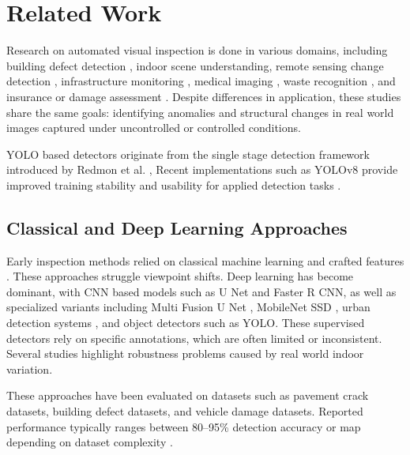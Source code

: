 \section{Related Work}
\label{sec:related_work}

Research on automated visual inspection is done in various domains, including building defect detection \cite{wen_autonomous_2024, kang_improvement_2025}, indoor scene understanding, remote sensing change detection \cite{cheng_change_2024}, infrastructure monitoring \cite{shang_automatic_2023}, medical imaging \cite{kamraoui_longitudinal_2022}, waste recognition \cite{malla_enhancing_2025}, and insurance or damage assessment \cite{lee_automated_2024}. Despite differences in application, these studies share the same goals: identifying anomalies and structural changes in real world images captured under uncontrolled or controlled conditions.

YOLO based detectors originate from the single stage detection framework introduced by Redmon et al. \cite{redmon_you_2016}, Recent implementations such as YOLOv8 provide improved training stability and usability for applied detection tasks \cite{jocher_ultralytics_2023}.

\subsection{Classical and Deep Learning Approaches}

Early inspection methods relied on classical machine learning and crafted features \cite{awe_towards_2025}. These approaches struggle viewpoint shifts. Deep learning has become dominant, with CNN based models such as U Net and Faster R CNN, as well as specialized variants including Multi Fusion U Net \cite{shang_automatic_2023}, MobileNet SSD \cite{goncalves_deep_2023}, urban detection systems \cite{sukel_detecting_2020}, and object detectors such as YOLO. These supervised detectors rely on specific annotations, which are often limited or inconsistent\cite{kang_improvement_2025}. Several studies highlight robustness problems caused by real world indoor variation\cite{wen_autonomous_2024,kang_improvement_2025}.

These approaches have been evaluated on datasets such as pavement crack datasets, building defect datasets, and vehicle damage datasets. Reported performance typically ranges between 80–95\% detection accuracy or map depending on dataset complexity \cite{lee_automated_2024,shang_automatic_2023,kang_improvement_2025}.

